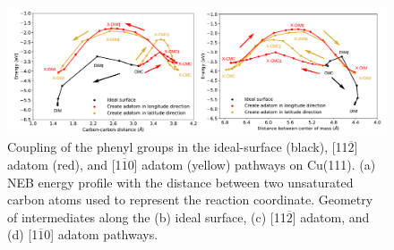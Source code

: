 \documentclass[journal=jacsat,manuscript=article]{achemso}
\begin{document}
\begin{figure}[hbt]
\centering
\includegraphics[width=1.0\textwidth]{Fig/distance-energy.pdf}
\caption{Coupling of the phenyl groups in the ideal-surface (black),  [11$\overline{2}$] adatom (red), and  [1$\overline{1}$0] adatom (yellow) pathways on Cu(111). (a) NEB energy profile with the distance between two unsaturated carbon atoms used to represent the reaction coordinate. Geometry of intermediates along the (b) ideal surface, (c) [11$\overline{2}$] adatom, and (d) [1$\overline{1}$0] adatom pathways.
}
\label{fig:distance-energy}
\end{figure}
\end{document}
